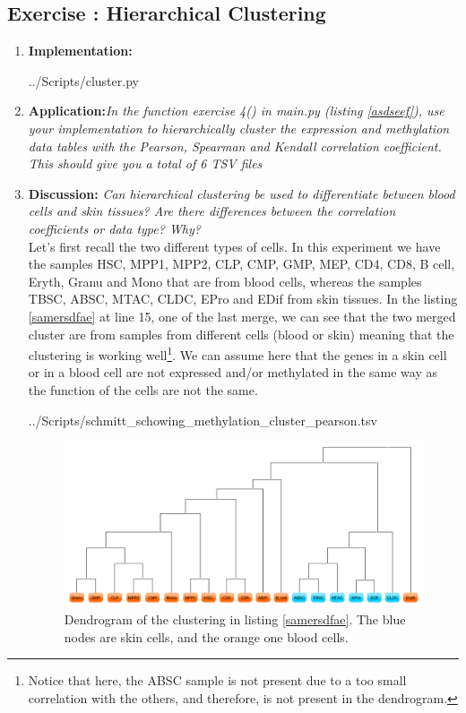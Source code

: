 \documentclass[10pt,a4paper]{article}
\newcommand{\exercise}[1]
{
  \stepcounter{subsection}
  \subsection*{Exercise \thesubsection: #1}

}
\begin{document}
\newpage
\exercise{Hierarchical Clustering}
\begin{enumerate}
	
	\item \textbf{Implementation: }
	
	 {../Scripts/cluster.py}
	
	\item \textbf{Application:}\textit{In the function exercise 4() in main.py (listing \ref{asdseef}), use your implementation to hierarchically cluster the expression and methylation data tables with the Pearson, Spearman and Kendall correlation coefficient. This should give you a total of 6 TSV files}\\
	
	
	\item \textbf{Discussion: }\textit{Can hierarchical clustering be used to differentiate between blood cells and skin tissues? Are there differences between the correlation coefficients or data type? Why?}\\
	
	Let's first recall the two different types of cells. In this experiment we have the samples HSC, MPP1, MPP2, CLP, CMP, GMP, MEP, CD4, CD8, B cell, Eryth, Granu and Mono that are from blood cells, whereas the samples TBSC, ABSC, MTAC, CLDC, EPro and EDif from skin tissues. In the listing \ref{samersdfae} at line 15, one of the last merge, we can see that the two merged cluster are from samples from different cells (blood or skin) meaning that the clustering is working well\footnote{Notice that here, the ABSC sample is not present due to a too small correlation with the others, and therefore, is not present in the dendrogram.}. We can assume here that the genes in a skin cell or in a blood cell are not expressed and/or methylated in the same way as the function of the cells are not the same. 
	
	 {../Scripts/schmitt\string_schowing\string_methylation\string_cluster\string_pearson.tsv}
	
	
	\begin{figure}[H]
		\centering
		\includegraphics[width=\paperwidth, angle=90]{img/clustering_methylation_pearson_dendrogram}
		\caption{Dendrogram of the clustering in listing \ref{samersdfae}. The blue nodes are skin cells, and the orange one blood cells.}
		\label{fig:clusteringmethylationpearsondendrogram}
	\end{figure}



\end{enumerate}
\end{document}

